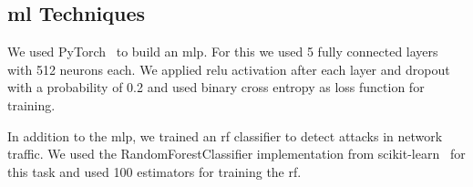 \documentclass[9pt,sigconf,letterpaper,dvipsnames\ifx\removeHeaders\tempYes ,nonacm\fi]{acmart}
\begin{document}

\subsection{\gls{ml} Techniques}
We used PyTorch~\cite{paszke_automatic_2017} to build an \gls{mlp}.
For this we used 5 fully connected layers with 512 neurons each. We applied \gls{relu} activation after each layer and dropout with a probability of 0.2 and used binary cross entropy  as loss function for training. %

In addition to the \gls{mlp}, we trained an \gls{rf} classifier to detect attacks in network traffic. We used the RandomForestClassifier implementation from scikit-learn~\cite{pedregosa_scikit-learn:_2011} for this task and used 100 estimators for training the \gls{rf}.
\end{document}
